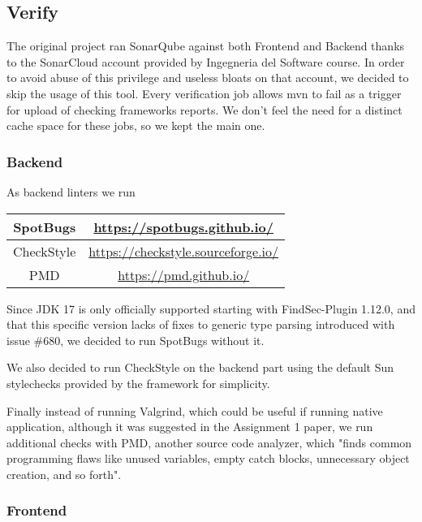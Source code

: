 \documentclass[a4paper,10pt]{scrartcl}
\begin{document}
\subsection{Verify}

The original project ran SonarQube against both Frontend and Backend thanks to the SonarCloud account provided by Ingegneria del Software course. In order to avoid abuse of this privilege and useless bloats on that account, we decided to skip the usage of this tool.
Every verification job allows mvn to fail as a trigger for upload of checking frameworks reports. We don't feel the need for a distinct cache space for these jobs, so we kept the main one.

\subsubsection{Backend}
 
As backend linters we run

\begin{center}
    \begin{tabular}{|c|c|}
        \hline
        SpotBugs & \href{https://spotbugs.github.io/}{https://spotbugs.github.io/} \\
        \hline
        CheckStyle & \href{https://checkstyle.sourceforge.io/}{https://checkstyle.sourceforge.io/} \\
        \hline
        PMD & \href{https://pmd.github.io/}{https://pmd.github.io/} \\
        \hline
    \end{tabular}
\end{center}

Since JDK 17 is only officially supported starting with FindSec-Plugin 1.12.0, and that this specific version lacks of fixes to generic type parsing introduced with issue \#680, we decided to run SpotBugs without it.

We also decided to run CheckStyle on the backend part using the default Sun stylechecks provided by the framework for simplicity.

Finally instead of running Valgrind, which could be useful if running native application, although it was suggested in the Assignment 1 paper, we run additional checks with PMD, another source code analyzer, which "finds common programming flaws like unused variables, empty catch blocks, unnecessary object creation, and so forth".

\subsubsection{Frontend}
\end{document}

